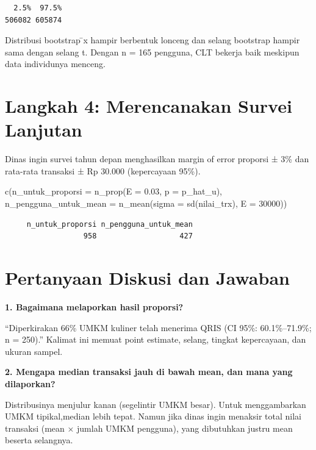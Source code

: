 \documentclass[
  indonesian,
  letterpaper,
]{book}
\newenvironment{Shaded}{\begin{snugshade}}{\end{snugshade}}
\newcommand{\AttributeTok}[1]{\textcolor[rgb]{0.40,0.45,0.13}{#1}}
\newcommand{\DecValTok}[1]{\textcolor[rgb]{0.68,0.00,0.00}{#1}}
\newcommand{\FloatTok}[1]{\textcolor[rgb]{0.68,0.00,0.00}{#1}}
\newcommand{\FunctionTok}[1]{\textcolor[rgb]{0.28,0.35,0.67}{#1}}
\newcommand{\NormalTok}[1]{\textcolor[rgb]{0.00,0.23,0.31}{#1}}
\begin{document}
\begin{verbatim}
  2.5%  97.5% 
506082 605874 
\end{verbatim}

Distribusi bootstrap ̄x hampir berbentuk lonceng dan selang bootstrap
hampir sama dengan selang t. Dengan n = 165 pengguna, CLT bekerja baik
meskipun data individunya menceng.

\section{Langkah 4: Merencanakan Survei
Lanjutan}\label{langkah-4-merencanakan-survei-lanjutan}

Dinas ingin survei tahun depan menghasilkan margin of error proporsi ±
3\% dan rata-rata transaksi ± Rp 30.000 (kepercayaan 95\%).

\begin{Shaded}
\begin{Highlighting}[]
\FunctionTok{c}\NormalTok{(}\AttributeTok{n\_untuk\_proporsi =} \FunctionTok{n\_prop}\NormalTok{(}\AttributeTok{E =} \FloatTok{0.03}\NormalTok{, }\AttributeTok{p =}\NormalTok{ p\_hat\_u),}
\AttributeTok{n\_pengguna\_untuk\_mean =} \FunctionTok{n\_mean}\NormalTok{(}\AttributeTok{sigma =} \FunctionTok{sd}\NormalTok{(nilai\_trx), }\AttributeTok{E =} \DecValTok{30000}\NormalTok{))}
\end{Highlighting}
\end{Shaded}

\begin{verbatim}
     n_untuk_proporsi n_pengguna_untuk_mean 
                  958                   427 
\end{verbatim}

\section{Pertanyaan Diskusi dan
Jawaban}\label{pertanyaan-diskusi-dan-jawaban}

\textbf{1. Bagaimana melaporkan hasil proporsi?}

``Diperkirakan 66\% UMKM kuliner telah menerima QRIS (CI 95\%:
60.1\%--71.9\%; n = 250).'' Kalimat ini memuat point estimate, selang,
tingkat kepercayaan, dan ukuran sampel.

\textbf{2. Mengapa median transaksi jauh di bawah mean, dan mana yang
dilaporkan?}

Distribusinya menjulur kanan (segelintir UMKM besar). Untuk
menggambarkan UMKM tipikal,median lebih tepat. Namun jika dinas ingin
menaksir total nilai transaksi (mean × jumlah UMKM pengguna), yang
dibutuhkan justru mean beserta selangnya.
\end{document}
